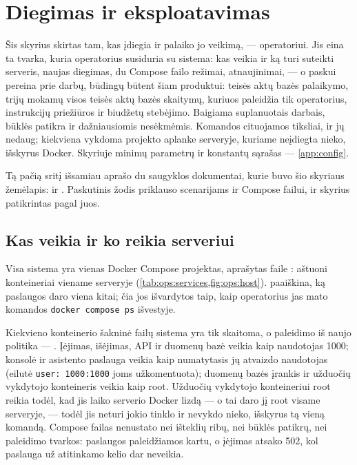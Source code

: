 \chapter{Diegimas ir eksploatavimas}\label{ch:ops}

Šis skyrius skirtas tam, kas įdiegia \product{} ir palaiko jo veikimą, --- operatoriui. Jis eina ta
tvarka, kuria operatorius susiduria su sistema: kas veikia ir ką turi suteikti serveris, naujas
diegimas, du Compose failo režimai, atnaujinimai, --- o paskui pereina
prie darbų, būdingų būtent šiam produktui: teisės aktų bazės palaikymo, trijų mokamų visos teisės aktų
bazės skaitymų, kuriuos paleidžia tik operatorius, instrukcijų priežiūros ir biudžetų stebėjimo.
Baigiama suplanuotais darbais, būklės patikra ir dažniausiomis nesėkmėmis. Komandos cituojamos
tiksliai, ir jų nedaug; kiekviena vykdoma projekto aplanke serveryje, kuriame neįdiegta nieko,
išskyrus Docker. Skyriuje minimų parametrų ir konstantų sąrašas --- \cref{app:config}.

Tą pačią sritį išsamiau aprašo du saugyklos dokumentai, kurie buvo šio skyriaus žemėlapis:
 ir . Paskutinis žodis priklauso
scenarijams ir Compose failui, ir skyrius patikrintas pagal juos.


\section{Kas veikia ir ko reikia serveriui}\label{sec:ops:runs}

Visa sistema yra vienas Docker Compose projektas, aprašytas faile :
aštuoni konteineriai viename serveryje (\cref{tab:ops:services,fig:ops:host}). 
paaiškina, ką paslaugos daro viena kitai; čia jos išvardytos taip, kaip operatorius jas mato
komandos \texttt{docker compose ps} išvestyje.

Kiekvieno konteinerio šakninė failų sistema yra tik skaitoma, o paleidimo iš naujo politika ---
. Įėjimas, išėjimas, API ir duomenų bazė veikia kaip naudotojas 1000; konsolė
ir asistento paslauga veikia kaip numatytasis jų atvaizdo naudotojas (eilutė
\texttt{user: 1000:1000} joms užkomentuota); duomenų bazės įrankis ir užduočių vykdytojo
konteineris veikia kaip root. Užduočių vykdytojo konteineriui root reikia todėl, kad jis laiko
serverio Docker lizdą --- o tai daro jį root visame serveryje, --- todėl jis neturi jokio tinklo ir
nevykdo nieko, išskyrus tą vieną komandą. Compose failas nenustato nei išteklių ribų, nei
būklės patikrų, nei paleidimo tvarkos: paslaugos paleidžiamos kartu, o įėjimas atsako 502, kol
paslauga už atitinkamo kelio dar neveikia.

